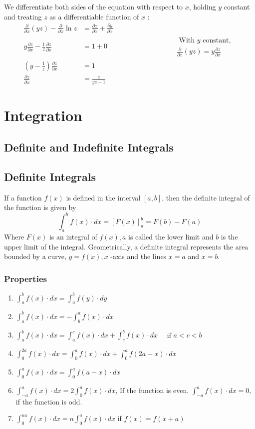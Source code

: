 \begin{answer}
	We differentiate both sides of the equation with respect to $x$, holding $y$ constant and treating $z$ as a differentiable function of $x$ :
	\begin{align*}
		\frac{\partial}{\partial x}(y z)-\frac{\partial}{\partial x} \ln z &=\frac{\partial x}{\partial x}+\frac{\partial y}{\partial x} \\
		y \frac{\partial z}{\partial x}-\frac{1}{z} \frac{\partial z}{\partial x} &=1+0 \hspace{4cm}
		 \begin{array}{l}
			\text { With } y \text { constant, } \\
			\frac{\partial}{\partial x}(y z)=y \frac{\partial z}{\partial x}
		\end{array} \\
		\left(y-\frac{1}{z}\right) \frac{\partial z}{\partial x}&=1 \\
		\frac{\partial z}{\partial x}&=\frac{z}{y z-1}
	\end{align*}
\end{answer}
\section{Integration}
\subsection{Definite and Indefinite Integrals}
\subsection{Definite Integrals}
If a function $f(x)$ is defined in the interval $[a, b]$, then the definite integral of the function is given by
$$
\int_{a}^{b} f(x) \cdot d x=[F(x)]_{a}^{b}=F(b)-F(a)
$$
Where $F(x)$ is an integral of $f(x), a$ is called the lower limit and $b$ is the upper limit of the integral.
Geometrically, a definite integral represents the area bounded by a curve, $y=f(x), x$ -axis and the lines $x=a$ and $x=b$.
\subsubsection{Properties}
\begin{enumerate}
	\item $ \int_{a}^{b} f(x) \cdot d x=\int_{a}^{b} f(y) \cdot d y$
	\item  $\int_{a}^{b} f(x) \cdot d x=-\int_{b}^{a} f(x) \cdot d x$
	\item  $\int_{a}^{b} f(x) \cdot d x=\int_{a}^{c} f(x) \cdot d x+\int_{c}^{b} f(x) \cdot d x \quad$ if $a<c<b$
	\item $\int_{0}^{2 a} f(x) \cdot d x=\int_{0}^{a} f(x) \cdot d x+\int_{0}^{a} f(2 a-x) \cdot d x$
	\item $\int_{0}^{a} f(x) \cdot d x=\int_{0}^{a} f(a-x) \cdot d x$
	\item $\int_{-a}^{a} f(x) \cdot d x=2 \int_{0}^{a} f(x) \cdot d x$, If the function is even. $\int_{-a}^{a} f(x) \cdot d x=0$, if the function is odd.
	\item $\int_{0}^{n a} f(x) \cdot d x=n \int_{0}^{a} f(x) \cdot d x$ if $f(x)=f(x+a)$
\end{enumerate}
